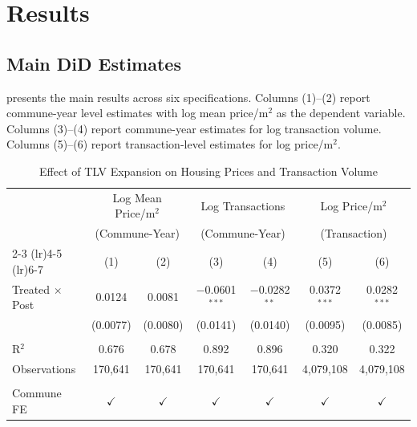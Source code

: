 \documentclass[12pt]{article}
\begin{document}
\section{Results}

\subsection{Main DiD Estimates}

 presents the main results across six specifications. Columns (1)--(2) report commune-year level estimates with log mean price/m$^2$ as the dependent variable. Columns (3)--(4) report commune-year estimates for log transaction volume. Columns (5)--(6) report transaction-level estimates for log price/m$^2$.

\begin{table}[htbp]
   \caption{Effect of TLV Expansion on Housing Prices and Transaction Volume}
   \label{tab:main_did}
   \bigskip
   \centering
   \begin{threeparttable}
   \begin{tabular}{lcccccc}
      \toprule
       & \multicolumn{2}{c}{Log Mean Price/m$^2$} & \multicolumn{2}{c}{Log Transactions} & \multicolumn{2}{c}{Log Price/m$^2$}\\
       & \multicolumn{2}{c}{(Commune-Year)} & \multicolumn{2}{c}{(Commune-Year)} & \multicolumn{2}{c}{(Transaction)}\\
      \cmidrule(lr){2-3} \cmidrule(lr){4-5} \cmidrule(lr){6-7}
                                   & (1)           & (2)           & (3)             & (4)            & (5)            & (6) \\
      \midrule
      Treated $\times$ Post        & 0.0124        & 0.0081        & $-$0.0601$^{***}$ & $-$0.0282$^{**}$ & 0.0372$^{***}$ & 0.0282$^{***}$\\
                                   & (0.0077)      & (0.0080)      & (0.0141)        & (0.0140)       & (0.0095)       & (0.0085)\\
      \\
      R$^2$                        & 0.676         & 0.678         & 0.892           & 0.896          & 0.320          & 0.322\\
      Observations                 & 170,641       & 170,641       & 170,641         & 170,641        & 4,079,108      & 4,079,108\\
      \\
      Commune FE                   & $\checkmark$  & $\checkmark$  & $\checkmark$    & $\checkmark$   & $\checkmark$   & $\checkmark$\\

\end{tabular}
\end{threeparttable}
\end{table}
\end{document}
